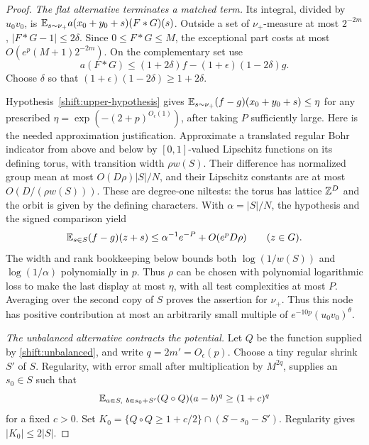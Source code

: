 \begin{proof}
\emph{The flat alternative terminates a matched term.}
Its integral, divided by $u_0v_0$, is
$\mathbb E_{s\sim\nu_+}a(x_0+y_0+s)(F*G)(s)$.
Outside a set of $\nu_+$-measure at most $2^{-2m}$,
$|F*G-1|\leq2\delta$.  Since $0\leq F*G\leq M$, the exceptional
part costs at most $O(e^p(M+1)2^{-2m})$.
On the complementary set use
\[
 a(F*G)\leq (1+2\delta)f
              -(1+\epsilon)(1-2\delta)g.
\]
Choose $\delta$ so that
$(1+\epsilon)(1-2\delta)\geq1+2\delta$.

Hypothesis~\eqref{shift:upper-hypothesis} gives
$\mathbb E_{s\sim\nu_+}(f-g)(x_0+y_0+s)\leq\eta$
for any prescribed $\eta=\exp(-(2+p)^{O_\epsilon(1)})$,
after taking $P$ sufficiently large.  Here is the needed
approximation justification.  Approximate a translated regular Bohr
indicator from above and below by $[0,1]$-valued Lipschitz functions
on its defining torus, with transition width $\rho w(S)$.  Their
difference has normalized group mean at most $O(D\rho)|S|/N$, and
their Lipschitz constants are at most $O(D/(\rho w(S)))$.
These are degree-one niltests: the torus has lattice $\mathbb Z^D$ and
the orbit is given by the defining characters.  With
$\alpha=|S|/N$, the hypothesis and the signed comparison yield
\[
 \mathbb E_{s\in S}(f-g)(z+s)
 \leq \alpha^{-1}e^{-P}+O(e^pD\rho)
 \qquad(z\in G).
\]
The width and rank bookkeeping below bounds both $\log(1/w(S))$
and $\log(1/\alpha)$ polynomially in $p$.  Thus $\rho$ can be chosen
with polynomial logarithmic loss to make the last display at most
$\eta$, with all test complexities at most $P$.
Averaging over the second copy of $S$ proves the assertion for $\nu_+$.
Thus this node has positive contribution at most an arbitrarily small
multiple of $e^{-10p}(u_0v_0)^\theta$.

\emph{The unbalanced alternative contracts the potential.}
Let $Q$ be the function supplied by \eqref{shift:unbalanced}, and
write $q=2m'=O_\epsilon(p)$.
Choose a tiny regular shrink $S'$ of $S$.  Regularity, with error
small after multiplication by $M^{2q}$, supplies an $s_0\in S$ such that
\[
 \mathbb E_{a\in S,\ b\in s_0+S'}(Q\circ Q)(a-b)^q
 \geq(1+c)^q
\]
for a fixed $c>0$.  Set
$K_0=\{Q\circ Q\geq1+c/2\}\cap(S-s_0-S')$.
Regularity gives $|K_0|\leq2|S|$.


\end{proof}
